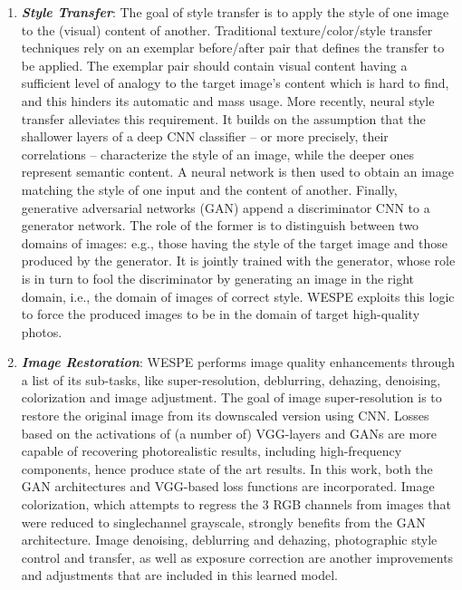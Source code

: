 \documentclass[11pt]{article}
\begin{document}
\begin{enumerate}
\item {\em \textbf{Style Transfer}}: The goal of style transfer is to apply the style of one image to
the (visual) content of another. Traditional texture/color/style
transfer techniques rely on an exemplar before/after
pair that defines the transfer to be applied. The
exemplar pair should contain visual content having a sufficient
level of analogy to the target image’s content which is
hard to find, and this hinders its automatic and mass usage.
More recently, neural style transfer alleviates this requirement. It builds on the assumption that the shallower
layers of a deep CNN classifier – or more precisely, their
correlations – characterize the style of an image, while the
deeper ones represent semantic content. A neural network is
then used to obtain an image matching the style of one input
and the content of another. Finally, generative adversarial
networks (GAN) append a discriminator CNN to a generator
network. The role of the former is to distinguish between
two domains of images: e.g., those having the style
of the target image and those produced by the generator. It
is jointly trained with the generator, whose role is in turn to
fool the discriminator by generating an image in the right domain,
i.e., the domain of images of correct style. WESPE exploits
this logic to force the produced images to be in the domain
of target high-quality photos.

\item {\em \textbf{Image Restoration}}: WESPE performs image quality enhancements through a list of its sub-tasks, like super-resolution, deblurring,
dehazing, denoising, colorization and image adjustment.
The goal of image super-resolution is to restore the original
image from its downscaled version using CNN. Losses based
on the activations of (a number of) VGG-layers and
GANs are more capable of recovering photorealistic results,
including high-frequency components, hence produce
state of the art results. In this work, both the
GAN architectures and VGG-based loss functions are incorporated.
Image colorization, which attempts to regress
the 3 RGB channels from images that were reduced to singlechannel
grayscale, strongly benefits from the GAN architecture. Image denoising, deblurring and dehazing, photographic style control and
transfer, as well as exposure correction are another
improvements and adjustments that are included in this
learned model.


\end{enumerate}
\end{document}
